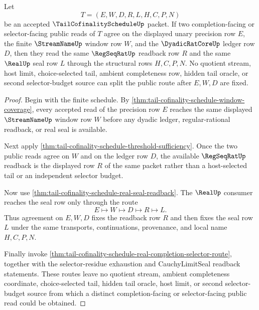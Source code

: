 \begin{theorem}
\label{thm:tail-cofinality-schedule-streamname-regseqrat-real-window-determinacy}
Let
$$
T=(E,W,D,R,L,H,C,P,N)
$$
be an accepted $\TailCofinalityScheduleUp$ packet. If two completion-facing or selector-facing public reads of $T$ agree on the displayed unary precision row $E$, the finite $\StreamNameUp$ window row $W$, and the $\DyadicRatCoreUp$ ledger row $D$, then they read the same $\RegSeqRatUp$ readback row $R$ and the same $\RealUp$ seal row $L$ through the structural rows $H,C,P,N$. No quotient stream, host limit, choice-selected tail, ambient completeness row, hidden tail oracle, or second selector-budget source can split the public route after $E,W,D$ are fixed.
\end{theorem}
\begin{proof}
Begin with the finite schedule. By
\autoref{thm:tail-cofinality-schedule-window-coverage}, every accepted read of
the precision row $E$ reaches the same displayed $\StreamNameUp$ window row
$W$ before any dyadic ledger, regular-rational readback, or real seal is
available.

Next apply \autoref{thm:tail-cofinality-schedule-threshold-sufficiency}. Once
the two public reads agree on $W$ and on the ledger row $D$, the available
$\RegSeqRatUp$ readback is the displayed row $R$ of the same packet rather than
a host-selected tail or an independent selector budget.

Now use \autoref{thm:tail-cofinality-schedule-real-seal-readback}. The
$\RealUp$ consumer reaches the seal row only through the route
$$
E \longmapsto W \longmapsto D \longmapsto R \longmapsto L.
$$
Thus agreement on $E,W,D$ fixes the readback row $R$ and then fixes the seal
row $L$ under the same transports, continuations, provenance, and local name
$H,C,P,N$.

Finally invoke
\autoref{thm:tail-cofinality-schedule-real-completion-selector-route},
together with the selector-residue exhaustion and CauchyLimitSeal readback
statements. These routes leave no quotient stream, ambient completeness
coordinate, choice-selected tail, hidden tail oracle, host limit, or second
selector-budget source from which a distinct completion-facing or
selector-facing public read could be obtained.
\end{proof}

